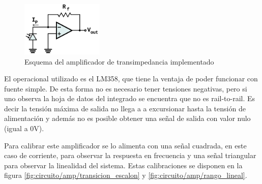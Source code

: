\begin{figure}[H]
    \centering
    \includegraphics[width=0.35\textwidth]{fig/circuito/amp/TIA}
    \caption{Esquema del amplificador de transimpedancia implementado}
    \label{fig:circuito/tia}
\end{figure}

El operacional utilizado es el LM358, que tiene la ventaja de poder funcionar con fuente simple. De esta forma no es necesario tener tensiones negativas, pero si uno observa la hoja de datos del integrado se encuentra que no es rail-to-rail. Es decir la tensión máxima de salida no llega a a excursionar hasta la tensión de alimentación y además no es posible obtener una señal de salida con valor nulo (igual a 0V).

Para calibrar este amplificador se lo alimenta con una señal cuadrada, en este caso de corriente, para observar la respuesta en frecuencia y una señal triangular para observar la linealidad del sistema. Estas calibraciones se disponen en la figura \ref{fig:circuito/amp/transicion_escalon} y \ref{fig:circuito/amp/rango_lineal}.


